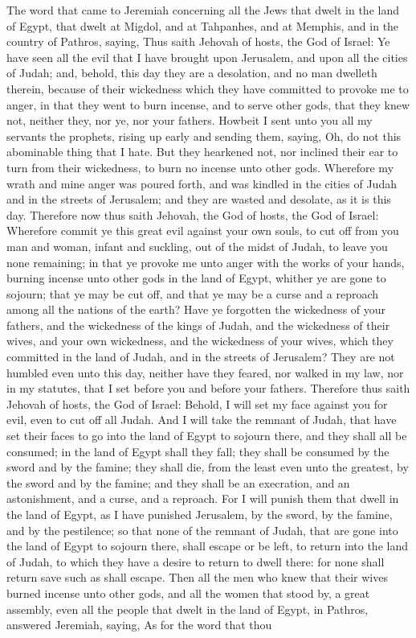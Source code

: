 The word that came to Jeremiah concerning all the Jews that dwelt in the land of Egypt, that dwelt at Migdol, and at Tahpanhes, and at Memphis, and in the country of Pathros, saying, Thus saith Jehovah of hosts, the God of Israel: Ye have seen all the evil that I have brought upon Jerusalem, and upon all the cities of Judah; and, behold, this day they are a desolation, and no man dwelleth therein, because of their wickedness which they have committed to provoke me to anger, in that they went to burn incense, and to serve other gods, that they knew not, neither they, nor ye, nor your fathers. Howbeit I sent unto you all my servants the prophets, rising up early and sending them, saying, Oh, do not this abominable thing that I hate. But they hearkened not, nor inclined their ear to turn from their wickedness, to burn no incense unto other gods. Wherefore my wrath and mine anger was poured forth, and was kindled in the cities of Judah and in the streets of Jerusalem; and they are wasted and desolate, as it is this day. Therefore now thus saith Jehovah, the God of hosts, the God of Israel: Wherefore commit ye this great evil against your own souls, to cut off from you man and woman, infant and suckling, out of the midst of Judah, to leave you none remaining; in that ye provoke me unto anger with the works of your hands, burning incense unto other gods in the land of Egypt, whither ye are gone to sojourn; that ye may be cut off, and that ye may be a curse and a reproach among all the nations of the earth? Have ye forgotten the wickedness of your fathers, and the wickedness of the kings of Judah, and the wickedness of their wives, and your own wickedness, and the wickedness of your wives, which they committed in the land of Judah, and in the streets of Jerusalem? They are not humbled even unto this day, neither have they feared, nor walked in my law, nor in my statutes, that I set before you and before your fathers.  Therefore thus saith Jehovah of hosts, the God of Israel: Behold, I will set my face against you for evil, even to cut off all Judah. And I will take the remnant of Judah, that have set their faces to go into the land of Egypt to sojourn there, and they shall all be consumed; in the land of Egypt shall they fall; they shall be consumed by the sword and by the famine; they shall die, from the least even unto the greatest, by the sword and by the famine; and they shall be an execration, and an astonishment, and a curse, and a reproach. For I will punish them that dwell in the land of Egypt, as I have punished Jerusalem, by the sword, by the famine, and by the pestilence; so that none of the remnant of Judah, that are gone into the land of Egypt to sojourn there, shall escape or be left, to return into the land of Judah, to which they have a desire to return to dwell there: for none shall return save such as shall escape.  Then all the men who knew that their wives burned incense unto other gods, and all the women that stood by, a great assembly, even all the people that dwelt in the land of Egypt, in Pathros, answered Jeremiah, saying, As for the word that thou 
